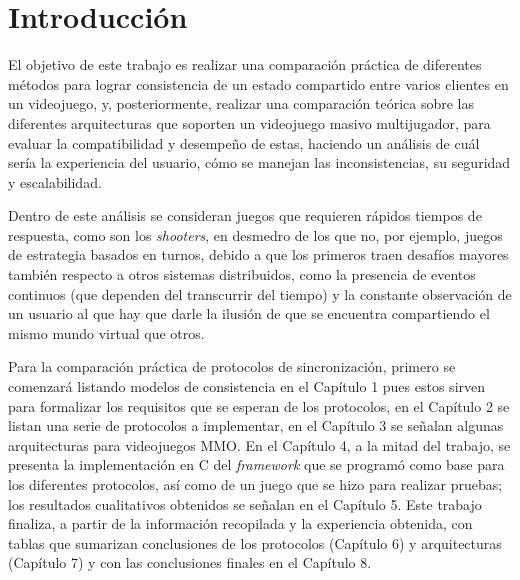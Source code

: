\section*{Introducción}


El objetivo de este trabajo es realizar una comparación práctica de diferentes métodos para lograr consistencia de un estado compartido entre varios clientes en un videojuego, y, posteriormente, realizar una comparación teórica sobre las diferentes arquitecturas que soporten un videojuego masivo multijugador, para evaluar la compatibilidad y desempeño de estas, haciendo un análisis de cuál sería la experiencia del usuario, cómo se manejan las inconsistencias, su seguridad y escalabilidad.

Dentro de este análisis se consideran juegos que requieren rápidos tiempos de respuesta, como son los \emph{shooters}, en desmedro de los que no, por ejemplo, juegos de estrategia basados en turnos, debido a que los primeros traen desafíos mayores también respecto a otros sistemas distribuidos, como la presencia de eventos continuos (que dependen del transcurrir del tiempo) y la constante observación de un usuario al que hay que darle la ilusión de que se encuentra compartiendo el mismo mundo virtual que otros.

Para la comparación práctica de protocolos de sincronización, primero se comenzará listando modelos de consistencia en el Capítulo 1 pues estos sirven para formalizar los requisitos que se esperan de los protocolos, en el Capítulo 2 se listan una serie de protocolos a implementar, en el Capítulo 3 se señalan algunas arquitecturas para videojuegos MMO. En el Capítulo 4, a la mitad del trabajo, se presenta la implementación en C del \emph{framework} que se programó como base para los diferentes protocolos, así como de un juego que se hizo para realizar pruebas; los resultados cualitativos obtenidos se señalan en el Capítulo 5. Este trabajo finaliza, a partir de la información recopilada y la experiencia obtenida, con tablas que sumarizan conclusiones de los protocolos (Capítulo 6) y arquitecturas (Capítulo 7) y con las conclusiones finales en el Capítulo 8.

